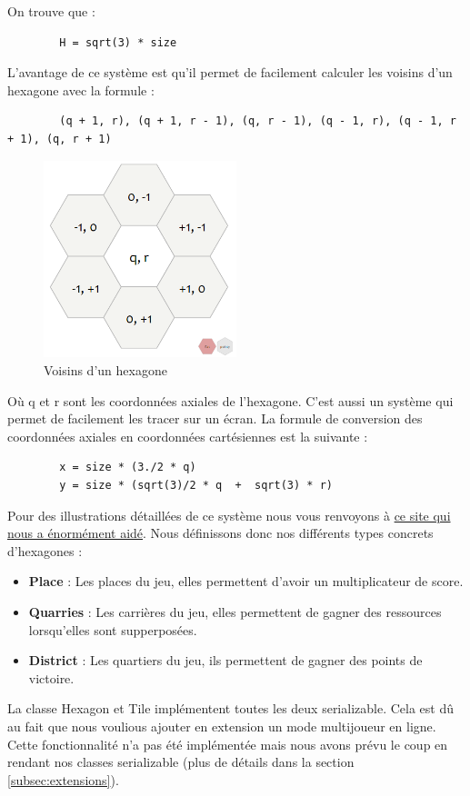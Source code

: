 \documentclass{article}
\begin{document}
    On trouve que :
    \begin{verbatim}
        H = sqrt(3) * size
    \end{verbatim}
    L'avantage de ce système est qu'il permet de facilement calculer les voisins d'un hexagone avec la formule :
    \begin{verbatim}
        (q + 1, r), (q + 1, r - 1), (q, r - 1), (q - 1, r), (q - 1, r + 1), (q, r + 1)
    \end{verbatim}
    \begin{figure}[H]
        \centering
        \includegraphics[width=0.5\textwidth]{coordiante.png}
        \caption{Voisins d'un hexagone}
        \end{figure}
    Où q et r sont les coordonnées axiales de l'hexagone.
    C'est aussi un système qui permet de facilement les tracer sur un écran.
    La formule de conversion des coordonnées axiales en coordonnées cartésiennes est la suivante :
    \begin{verbatim}
        x = size * (3./2 * q)
        y = size * (sqrt(3)/2 * q  +  sqrt(3) * r)
    \end{verbatim}
    Pour des illustrations détaillées de ce système nous vous renvoyons à \href{https://www.redblobgames.com/grids/hexagons/}{ce site qui nous a énormément aidé}.
    Nous définissons donc nos différents types concrets d'hexagones :
    \begin{itemize}
        \item \textbf{Place} : Les places du jeu, elles permettent d'avoir un multiplicateur de score.
        \item \textbf{Quarries} : Les carrières du jeu, elles permettent de gagner des ressources lorsqu'elles sont supperposées.
        \item \textbf{District} : Les quartiers du jeu, ils permettent de gagner des points de victoire.
    \end{itemize}
    La classe Hexagon et Tile implémentent toutes les deux serializable. Cela est dû au fait que nous voulious ajouter en extension un mode multijoueur en ligne.
    Cette fonctionnalité n'a pas été implémentée mais nous avons prévu le coup en rendant nos classes serializable (plus de détails dans la section \ref{subsec:extensions}).
\end{document}
